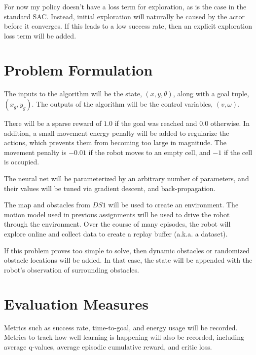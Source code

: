 \documentclass[11pt]{article}
\begin{document}
For now my policy doesn’t have a loss term for exploration, as is the case in the standard SAC. Instead, initial exploration will naturally be caused by the actor before it converges. If this leads to a low success rate, then an explicit exploration loss term will be added.


\section{Problem Formulation}

The inputs to the algorithm will be the state, $(x, y, \theta)$, along with a goal tuple, $(x_g, y_g)$. The outputs of the algorithm will be the control variables, $(v, \omega)$.

There will be a sparse reward of $1.0$ if the goal was reached and $0.0$ otherwise. In addition, a small movement energy penalty will be added to regularize the actions, which prevents them from becoming too large in magnitude. The movement penalty is $-0.01$ if the robot moves to an empty cell, and $-1$ if the cell is occupied.

The neural net will be parameterized by an arbitrary number of parameters, and their values will be tuned via gradient descent, and back-propagation.

The map and obstacles from $DS1$ will be used to create an environment. The motion model used in previous assignments will be used to drive the robot through the environment. Over the course of many episodes, the robot will explore online and collect data to create a replay buffer (a.k.a. a dataset). 

If this problem proves too simple to solve, then dynamic obstacles or randomized obstacle locations will be added. In that case, the state will be appended with the robot's observation of surrounding obstacles.


\section{Evaluation Measures}

Metrics such as success rate, time-to-goal, and energy usage will be recorded.  Metrics to track how well learning is happening will also be recorded, including average q-values, average episodic cumulative reward, and critic loss.
\end{document}
